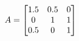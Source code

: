 \documentclass[preview]{standalone}
\begin{document}
\begin{align*}
\special{dvisvgm:raw <g id='unique000'>}A = \begin{bmatrix} 1.5 & 0.5 & 0 \\ 0 & 1 & 1 \\ 0.5 & 0 & 1 \end{bmatrix}\special{dvisvgm:raw </g>}
\end{align*}
\end{document}
